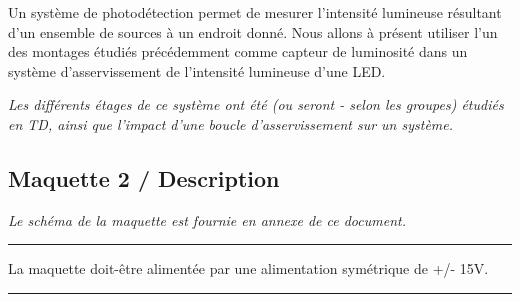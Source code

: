 Un système de photodétection permet de mesurer l'intensité lumineuse résultant d'un ensemble de sources à un endroit donné. Nous allons à présent utiliser l'un des montages étudiés précédemment comme capteur de luminosité dans un système d'asservissement de l'intensité lumineuse d'une LED.

\textit{Les différents étages de ce système ont été (ou seront - selon les groupes) étudiés en TD, ainsi que l'impact d'une boucle d'asservissement sur un système.}

\bigskip

\begin{center}
{\Large
{}
}
\end{center}



\subsection{Maquette 2 / Description}

\textit{Le schéma de la maquette est fournie en annexe de ce document.}


\noindent \rule{\linewidth}{1pt}

La maquette doit-être alimentée par une alimentation symétrique de +/- 15V.

\noindent \rule{\linewidth}{1pt}

